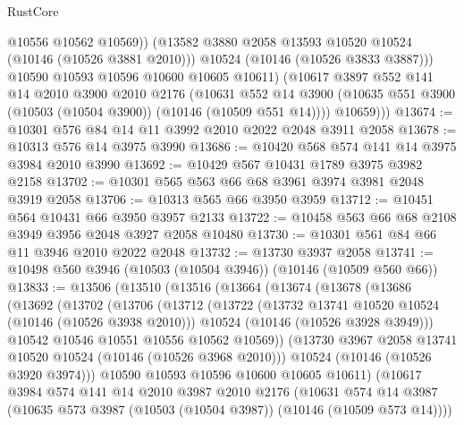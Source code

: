 \begin{lexlean}{RustCore}
\begin{coremodule}
                @10556
                @10562
                @10569))
            (@13582 @3880 @2058 @13593 @10520 @10524 (@10146 (@10526 @3881 @2010)))
            @10524
            (@10146 (@10526 @3833 @3887)))
          @10590
          @10593
          @10596
          @10600
          @10605
          @10611)
        (@10617
          @3897
          @552
          @141
          @14
          @2010
          @3900
          @2010
          @2176
          (@10631
            @552
            @14
            @3900
            (@10635 @551 @3900 (@10503 (@10504 @3900)) (@10146 (@10509 @551 @14))))
          @10659)))
@13674 := @10301 @576 @84 @14 @11 @3992 @2010 @2022 @2048 @3911 @2058
@13678 := @10313 @576 @14 @3975 @3990
@13686 := @10420 @568 @574 @141 @14 @3975 @3984 @2010 @3990
@13692 := @10429 @567 @10431 @1789 @3975 @3982 @2158
@13702 := @10301 @565 @563 @66 @68 @3961 @3974 @3981 @2048 @3919 @2058
@13706 := @10313 @565 @66 @3950 @3959
@13712 := @10451 @564 @10431 @66 @3950 @3957 @2133
@13722 := @10458 @563 @66 @68 @2108 @3949 @3956 @2048 @3927 @2058 @10480
@13730 := @10301 @561 @84 @66 @11 @3946 @2010 @2022 @2048
@13732 := @13730 @3937 @2058
@13741 := @10498 @560 @3946 (@10503 (@10504 @3946)) (@10146 (@10509 @560 @66))
@13833 := @13506
    (@13510
      (@13516
        (@13664
          (@13674
            (@13678
              (@13686
                (@13692
                  (@13702
                    (@13706
                      (@13712
                        (@13722
                          (@13732 @13741 @10520 @10524 (@10146 (@10526 @3938 @2010)))
                          @10524
                          (@10146 (@10526 @3928 @3949)))
                        @10542
                        @10546
                        @10551
                        @10556
                        @10562
                        @10569))
                    (@13730 @3967 @2058 @13741 @10520 @10524 (@10146 (@10526 @3968 @2010)))
                    @10524
                    (@10146 (@10526 @3920 @3974)))
                  @10590
                  @10593
                  @10596
                  @10600
                  @10605
                  @10611)
                (@10617
                  @3984
                  @574
                  @141
                  @14
                  @2010
                  @3987
                  @2010
                  @2176
                  (@10631
                    @574
                    @14
                    @3987
                    (@10635 @573 @3987 (@10503 (@10504 @3987)) (@10146 (@10509 @573 @14))))

\end{coremodule}
\end{lexlean}
